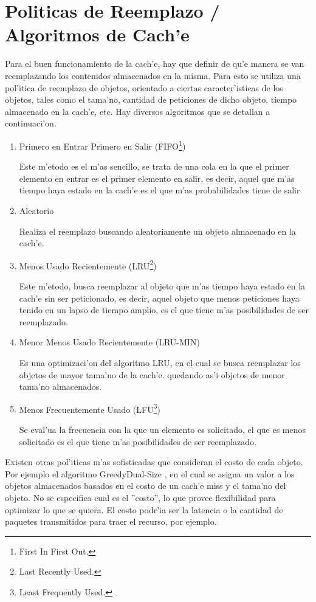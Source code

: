 \section{Politicas de Reemplazo / Algoritmos de Cach'e}
\label{politicasReemplazo}
Para el buen funcionamiento de la cach'e, hay que definir de qu'e manera se van reemplazando los contenidos almacenados en la misma. Para esto se utiliza una pol'itica de reemplazo de objetos, orientado a ciertas caracter'isticas de los objetos, tales como el tama'no, cantidad de peticiones de dicho objeto, tiempo almacenado en la cach'e, etc.
Hay diversos algoritmos que se detallan a continuaci'on.
\begin{enumerate}
\item Primero en Entrar Primero en Salir (FIFO\footnote{First In First Out.})

Este m'etodo es el m'as sencillo, se trata de una cola en la que el primer elemento en entrar es el primer elemento en salir, es decir, aquel que m'as tiempo haya estado en la cach'e es el que m'as probabilidades tiene de salir.
\clearpage
\item Aleatorio

Realiza el reemplazo buscando aleatoriamente un objeto almacenado en la cach'e.
\item Menos Usado Recientemente (LRU\footnote{Last Recently Used.})

Este m'etodo, busca reemplazar al objeto que m'as tiempo haya estado en la cach'e sin ser peticionado, es decir, aquel objeto que menos peticiones haya tenido en un lapso de tiempo amplio, es el que tiene m'as posibilidades de ser reemplazado.
\item Menor Menos Usado Recientemente (LRU-MIN)

Es una optimizaci'on del algoritmo LRU, en el cual se busca reemplazar los objetos de mayor tama'no de la cach'e. quedando as'i objetos de menor tama'no almacenados.
\item Menos Frecuentemente Usado (LFU\footnote{Least Frequently Used.})

Se eval'ua la frecuencia con la que un elemento es solicitado, el que es menos solicitado es el que tiene m'as posibilidades de ser reemplazado.
\end{enumerate}

Existen otras pol'iticas m'as sofisticadas que consideran el costo de cada objeto. Por ejemplo el algoritmo GreedyDual-Size \citep{webCaching}, en el cual se asigna un valor a los objetos almacenados basados en el costo de un cach'e miss y el tama'no del objeto. No se especifica cual es el ''costo'', lo que provee flexibilidad para optimizar lo que se quiera. El costo podr'ia ser la latencia o la cantidad de paquetes transmitidos para traer el recurso, por ejemplo.

